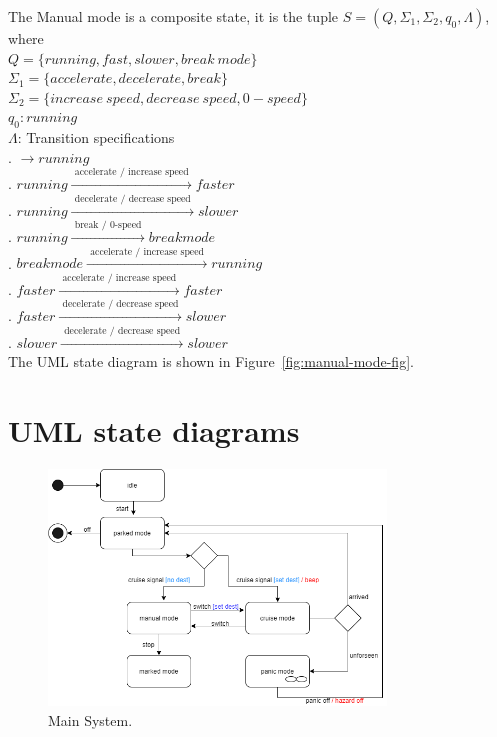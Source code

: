 \documentclass[12pt]{article}
\begin{document}
\begin{spacing}{1.5}
\noindent The Manual mode is a composite state, it is the tuple $S = (Q, \Sigma_1, \Sigma_2, q_0, \Lambda)$, where\\

\noindent $Q = \{running, fast, slower, break~mode\}$\\
\noindent $\Sigma_1 = \{accelerate, decelerate, break\}$\\
\noindent $\Sigma_2 = \{increase~speed, decrease~speed, 0-speed\}$\\
\noindent $q_0: running$\\
\noindent $\Lambda$: Transition specifications\\
. $\rightarrow running$\\
. $running \xrightarrow {\text { accelerate / increase speed }} faster$\\
. $running \xrightarrow {\text { decelerate / decrease speed }} slower$\\
. $running \xrightarrow {\text { break / 0-speed }} break mode$\\
. $break mode \xrightarrow {\text { accelerate / increase speed }} running$\\
. $faster \xrightarrow {\text { accelerate / increase speed }} faster$\\
. $faster \xrightarrow {\text { decelerate / decrease speed }} slower$\\
. $slower \xrightarrow {\text { decelerate / decrease speed }} slower$\\


\noindent The UML state diagram is shown in Figure~\ref{fig:manual-mode-fig}.

\newpage

\section{UML state diagrams}

\begin{figure}[h!]
	\centering
		\includegraphics[width=0.8\textwidth]{./A2_Figures/4.1-Main-System.png}
		  \caption{Main System.}
  \label{fig:main-system-fig}
\end{figure}


\end{spacing}
\end{document}
